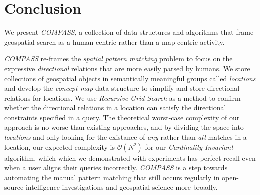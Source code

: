 \section{Conclusion}
\label{section:conclusion}
\normalsize
{}
We present \emph{COMPASS}, a collection of data structures and algorithms that frame geospatial search as a human-centric rather than a map-centric activity. 

\emph{COMPASS} re-frames the \textit{spatial pattern matching} problem to focus on the expressive \textit{directional} relations that are more easily parsed by humans. 
%
We store collections of geospatial objects in semantically meaningful groups called \textit{locations} and develop the \textit{concept map} data structure to simplify and store directional relations for locations. 
We use \textit{Recursive Grid Search} as a method to confirm whether the directional relations in a location can satisfy the directional constraints specified in a query. 
%
The theoretical worst-case complexity of our approach is no worse than existing approaches, and by dividing the space into \textit{locations} and only looking for the existance of \textit{any} rather than \textit{all} matches in a location, our expected complexity is $\mathcal{O}(N^{2})$ for our \textit{Cardinality-Invariant} algorithm, which which we demonstrated with experiments has perfect recall even when a user aligns their queries incorrectly.
%
\emph{COMPASS} is a step towards automating the manual pattern matching that still occurs regularly in open-source intelligence investigations and geospatial science more broadly.
%
%
